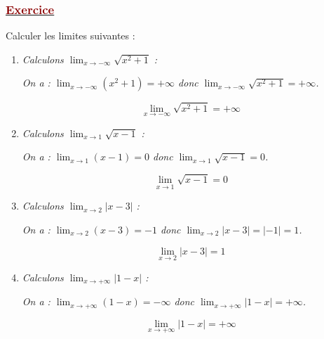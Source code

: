 \documentclass[12pt,a4paper]{article}
\begin{document}
\subsubsection*{\underline{\textcolor{darkred}{ Exercice }}}
Calculer les limites suivantes :
\begin{enumerate}
    \item \textit{Calculons $\displaystyle \lim_{x \to -\infty} \sqrt{x^2 + 1}$ :}
    
    \vspace{0.2cm}
    
    \textit{On a : $\displaystyle \lim_{x \to -\infty} (x^2 + 1) = +\infty$ donc $\displaystyle \lim_{x \to -\infty} \sqrt{x^2 + 1} = +\infty$.}
    
    \[
    \boxed{\lim_{x \to -\infty} \sqrt{x^2 + 1} = +\infty}
    \]

    \vspace{0.4cm}

    \item \textit{Calculons $\displaystyle \lim_{x \to 1} \sqrt{x - 1}$ :}
    
    \vspace{0.2cm}
    
    \textit{On a : $\displaystyle \lim_{x \to 1} (x - 1) = 0$ donc $\displaystyle \lim_{x \to 1} \sqrt{x - 1} = 0$.}
    
    \[
    \boxed{\lim_{x \to 1} \sqrt{x - 1} = 0}
    \]

    \vspace{0.4cm}

    \item \textit{Calculons $\displaystyle \lim_{x \to 2} |x - 3|$ :}
    
    \vspace{0.2cm}
    
    \textit{On a : $\displaystyle \lim_{x \to 2} (x - 3) = -1$ donc $\displaystyle \lim_{x \to 2} |x - 3| = |-1| = 1$.}
    
    \[
    \boxed{\lim_{x \to 2} |x - 3| = 1}
    \]

    \vspace{0.4cm}

    \item \textit{Calculons $\displaystyle \lim_{x \to +\infty} |1 - x|$ :}
    
    \vspace{0.2cm}
    
    \textit{On a : $\displaystyle \lim_{x \to +\infty} (1 - x) = -\infty$ donc $\displaystyle \lim_{x \to +\infty} |1 - x| = +\infty$.}
    
    \[
    \boxed{\lim_{x \to +\infty} |1 - x| = +\infty}
    \]
\end{enumerate}
\end{document}
